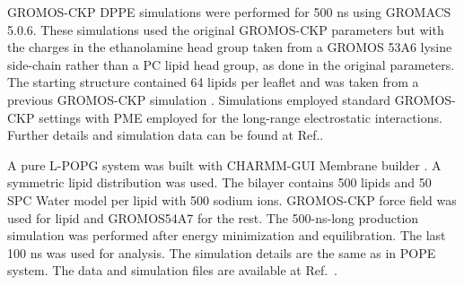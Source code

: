\documentclass[journal=jpcbfk]{achemso}
\begin{document}

 GROMOS-CKP DPPE simulations were performed for 500 ns using GROMACS 5.0.6. These simulations used the original GROMOS-CKP parameters \cite{piggot11} but with the charges in the ethanolamine head group taken from a GROMOS 53A6 lysine side-chain rather than a PC lipid head group, as done in the original parameters. The starting structure contained 64 lipids per leaflet and was taken from a previous GROMOS-CKP simulation \cite{piggot11}. Simulations employed standard GROMOS-CKP settings with PME employed for the long-range electrostatic interactions. Further details and simulation data can be found at Ref..

A pure L-POPG system was built with CHARMM-GUI Membrane builder \cite{lee16}. A symmetric lipid distribution was used. The bilayer contains 500 lipids and 50 SPC Water model per lipid with 500 sodium ions. GROMOS-CKP force field was used for lipid \cite{piggot11} and GROMOS54A7 \cite{schmid11} for the rest.
The 500-ns-long production simulation was performed after energy minimization and equilibration.
The last 100 ns was used for analysis.
The simulation details are the same as in POPE system.
The data and simulation files are available at Ref.~.


 
\end{document}
